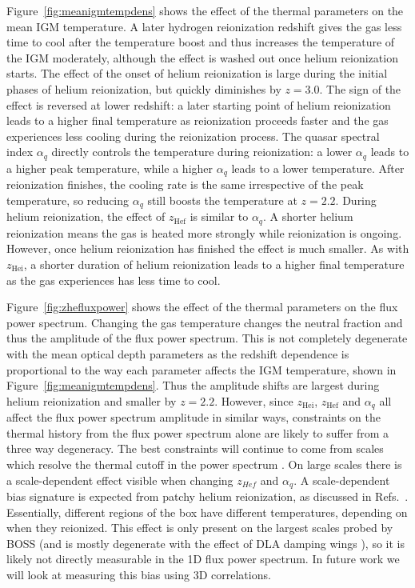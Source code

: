 \documentclass[a4paper,11pt]{article}
\begin{document}
Figure~\ref{fig:meanigmtempdens} shows the effect of the thermal parameters on the mean IGM temperature. A later hydrogen reionization redshift gives the gas less time to cool after the temperature boost and thus increases the temperature of the IGM moderately, although the effect is washed out once helium reionization starts. The effect of the onset of helium reionization is large during the initial phases of helium reionization, but quickly diminishes by $z=3.0$. The sign of the effect is reversed at lower redshift: a later starting point of helium reionization leads to a higher final temperature as reionization proceeds faster and the gas experiences less cooling during the reionization process. The quasar spectral index $\alpha_q$ directly controls the temperature during reionization: a lower $\alpha_q$ leads to a higher peak temperature, while a higher $\alpha_q$ leads to a lower temperature. After reionization finishes, the cooling rate is the same irrespective of the peak temperature, so reducing $\alpha_q$ still boosts the temperature at $z=2.2$. During helium reionization, the effect of  $z_\mathrm{Hef}$ is similar to $\alpha_q$. A shorter helium reionization means the gas is heated more strongly while reionization is ongoing. However, once helium reionization has finished the effect is much smaller. As with $z_\mathrm{Hei}$, a shorter duration of helium reionization leads to a higher final temperature as the gas experiences has less time to cool.

Figure~\ref{fig:zhefluxpower} shows the effect of the thermal parameters on the flux power spectrum. Changing the gas temperature changes the neutral fraction and thus the amplitude of the flux power spectrum. This is not completely degenerate with the mean optical depth parameters as the redshift dependence is proportional to the way each parameter affects the IGM temperature, shown in Figure~\ref{fig:meanigmtempdens}. Thus the amplitude shifts are largest during helium reionization and smaller by $z=2.2$. However, since $z_\mathrm{Hei}$, $z_\mathrm{Hef}$ and $\alpha_q$ all affect the flux power spectrum amplitude in similar ways, constraints on the thermal history from the flux power spectrum alone are likely to suffer from a three way degeneracy. The best constraints will continue to come from scales which resolve the thermal cutoff in the power spectrum \cite{Gaikwad:2021}. On large scales there is a scale-dependent effect visible when changing $z_{Hef}$ and $\alpha_q$. A scale-dependent bias signature is expected from patchy helium reionization, as discussed in Refs.~\cite{Pontzen:2014a, Pontzen:2014b,  Gontcho:2014}. Essentially, different regions of the box have different temperatures, depending on when they reionized. This effect is only present on the largest scales probed by BOSS (and is mostly degenerate with the effect of DLA damping wings \cite{Rogers:2017}), so it is likely not directly measurable in the 1D flux power spectrum. In future work we will look at measuring this bias using 3D correlations.
\end{document}
